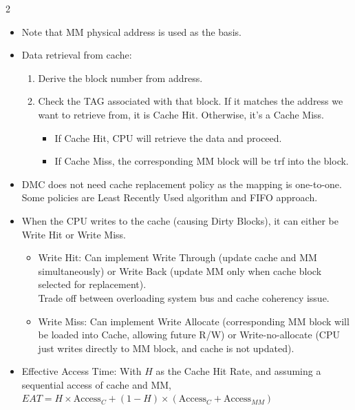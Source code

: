 \documentclass[10pt]{article}
\begin{document}
\begin{multicols}{2}
\begin{itemize}
\begin{itemize}
    \end{itemize}
    \item Note that MM physical address is used as the basis. 
    \item Data retrieval from cache:
    \begin{enumerate}
        \item Derive the block number from address.
        \item Check the TAG associated with that block. If it matches the address we want to retrieve from, it is Cache Hit. Otherwise, it's a Cache Miss.
        \begin{itemize}
            \item If Cache Hit, CPU will retrieve the data and proceed.
            \item If Cache Miss, the corresponding MM block will be trf into the block.
        \end{itemize}
    \end{enumerate}
    \item DMC does not need cache replacement policy as the mapping is one-to-one.
    Some policies are Least Recently Used algorithm and FIFO approach.
    \item When the CPU writes to the cache (causing Dirty Blocks), it can either be Write Hit or Write Miss.
    \begin{itemize}
        \item Write Hit: Can implement Write Through (update cache and MM simultaneously) or Write Back (update MM only when cache block selected for replacement).\\
        Trade off between overloading system bus and cache coherency issue.
        \item Write Miss: Can implement Write Allocate (corresponding MM block will be loaded into Cache, allowing future R/W) or Write-no-allocate (CPU just writes directly to MM block, and cache is not updated).
    \end{itemize}
    \item Effective Access Time: With $H$ as the Cache Hit Rate, and assuming a sequential access of cache and MM,
    $EAT = H \times \text{Access}_C + (1-H) \times (\text{Access}_C + \text{Access}_{MM})$
\end{itemize}


\end{multicols}
\end{document}
